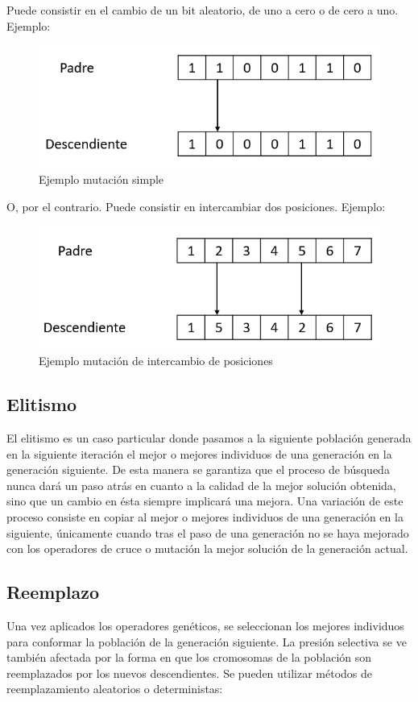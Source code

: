 Puede consistir en el cambio de un bit aleatorio, de uno a cero o de cero a uno.
Ejemplo:

\begin{figure}[h]
    \centering
    \includegraphics[width=.5\textwidth]{images/mutacion1.png}
    \caption{Ejemplo mutación simple}
    \label{fig:img0}
\end{figure}


O, por el contrario. Puede consistir en intercambiar dos posiciones.
Ejemplo:

\begin{figure}[h]
    \centering
    \includegraphics[width=.5\textwidth]{images/mutacion2.png}
    \caption{Ejemplo mutación de intercambio de posiciones}
    \label{fig:img1}
\end{figure}


\subsection{Elitismo}
El elitismo es un caso particular donde pasamos a la siguiente población generada en la siguiente iteración el mejor o mejores individuos de una generación en la generación siguiente. De esta manera se garantiza que el proceso de búsqueda nunca dará un paso atrás en cuanto a la calidad de la mejor solución obtenida, sino que un cambio en ésta siempre implicará una mejora. Una variación de este proceso consiste en copiar al mejor o mejores individuos de una generación en la siguiente, únicamente cuando tras el paso de una generación no se haya mejorado con los operadores de cruce o mutación la mejor solución de la generación actual.

\subsection{Reemplazo}\label{reemplazamiento}
Una vez aplicados los operadores genéticos, se seleccionan los mejores individuos para conformar la población de la generación siguiente. La presión selectiva se ve también afectada por la forma en que los cromosomas de la población son reemplazados por los nuevos descendientes. Se pueden utilizar métodos de reemplazamiento aleatorios o deterministas:

